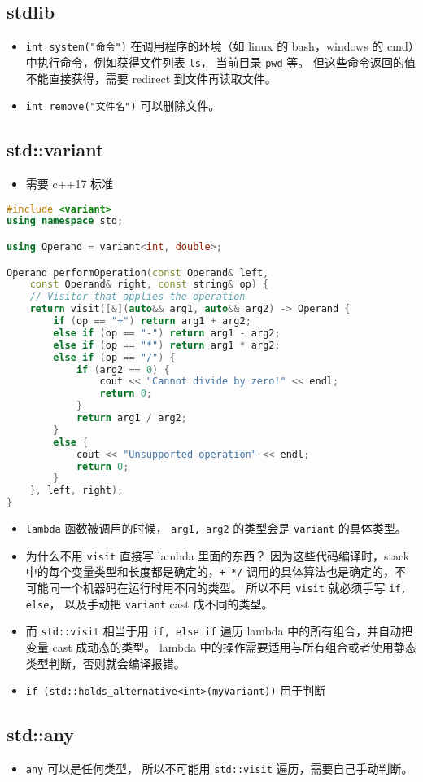 \subsection{stdlib}
\begin{itemize}
\item \verb`int system("命令")` 在调用程序的环境（如 linux 的 bash，windows 的 cmd）中执行命令，例如获得文件列表 \verb`ls`， 当前目录 \verb`pwd` 等。 但这些命令返回的值不能直接获得，需要 redirect 到文件再读取文件。
\item \verb`int remove("文件名")` 可以删除文件。
\end{itemize}

\subsection{std::variant}
\begin{itemize}
\item 需要 c++17 标准
\end{itemize}
\begin{lstlisting}[language=cpp]
#include <variant>
using namespace std;

using Operand = variant<int, double>;

Operand performOperation(const Operand& left,
    const Operand& right, const string& op) {
    // Visitor that applies the operation
    return visit([&](auto&& arg1, auto&& arg2) -> Operand {
        if (op == "+") return arg1 + arg2;
        else if (op == "-") return arg1 - arg2;
        else if (op == "*") return arg1 * arg2;
        else if (op == "/") {
            if (arg2 == 0) {
                cout << "Cannot divide by zero!" << endl;
                return 0;
            }
            return arg1 / arg2;
        }
        else {
            cout << "Unsupported operation" << endl;
            return 0;
        }
    }, left, right);
}
\end{lstlisting}
\begin{itemize}
\item \verb|lambda| 函数被调用的时候， \verb|arg1, arg2| 的类型会是 \verb|variant| 的具体类型。
\item 为什么不用 \verb`visit` 直接写 lambda 里面的东西？ 因为这些代码编译时，stack 中的每个变量类型和长度都是确定的，\verb|+-*/| 调用的具体算法也是确定的，不可能同一个机器码在运行时用不同的类型。 所以不用 \verb|visit| 就必须手写 \verb|if, else|， 以及手动把 \verb|variant| cast 成不同的类型。
\item 而 \verb|std::visit| 相当于用 \verb|if, else if| 遍历 lambda 中的所有组合，并自动把变量 cast 成动态的类型。 lambda 中的操作需要适用与所有组合或者使用静态类型判断，否则就会编译报错。
\item \verb|if (std::holds_alternative<int>(myVariant))| 用于判断
\end{itemize}

\subsection{std::any}
\begin{itemize}
\item \verb|any| 可以是任何类型， 所以不可能用 \verb|std::visit| 遍历，需要自己手动判断。
\end{itemize}
